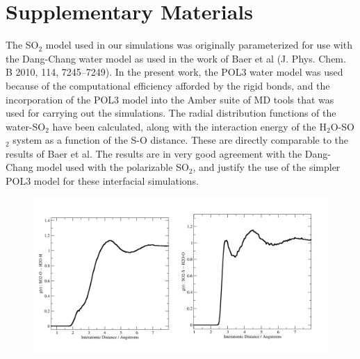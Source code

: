 \documentclass{article}
\begin{document}
\newcommand{\suldiox}{SO$_2$}
\newcommand{\ang}{\,$\textrm{\AA}$}
\newcommand{\angs}{\ang}
\newcommand{\wat}{H$_2$O}

\doublespacing

\section* {Supplementary Materials}

The SO$_2$ model used in our simulations was originally parameterized for use with the Dang-Chang water model as used in the work of Baer et al (J. Phys. Chem. B 2010, 114, 7245–7249). In the present work, the POL3 water model was used because of the computational efficiency afforded by the rigid bonds, and the incorporation of the POL3 model into the Amber suite of MD tools that was used for carrying out the simulations. The radial distribution functions of the water-SO$_2$ have been calculated, along with the interaction energy of the H$_2$O-SO$_2$ system as a function of the S-O distance. These are directly comparable to the results of Baer et al. The results are in very good agreement with the Dang-Chang model used with the polarizable SO$_2$, and justify the use of the simpler POL3 model for these interfacial simulations.


\begin{figure}[h!]
	\begin{center}
		\includegraphics[scale=1.0]{images/rdf/rdf.png}
	\end{center}
\end{figure}
\end{document}
